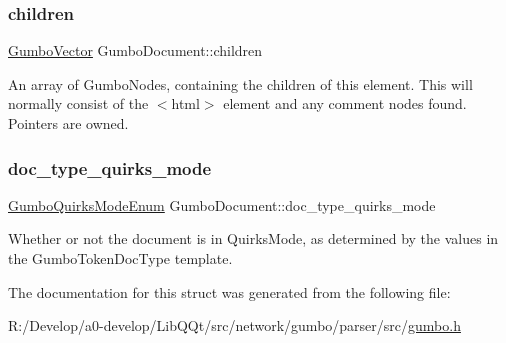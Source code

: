\subsubsection{\texorpdfstring{children}{children}}
{\footnotesize\ttfamily \mbox{\hyperlink{struct_gumbo_vector}{Gumbo\+Vector}} Gumbo\+Document\+::children}

An array of Gumbo\+Nodes, containing the children of this element. This will normally consist of the $<$html$>$ element and any comment nodes found. Pointers are owned. \mbox{\label{struct_gumbo_document_aa8135059f582a2c8309dcdd66eef7772}} 
\subsubsection{\texorpdfstring{doc\+\_\+type\+\_\+quirks\+\_\+mode}{doc\_type\_quirks\_mode}}
{\footnotesize\ttfamily \mbox{\hyperlink{gumbo_8h_aa0cbbfcc7ab2be48ac329ef7e76ff135}{Gumbo\+Quirks\+Mode\+Enum}} Gumbo\+Document\+::doc\+\_\+type\+\_\+quirks\+\_\+mode}

Whether or not the document is in Quirks\+Mode, as determined by the values in the Gumbo\+Token\+Doc\+Type template. 

The documentation for this struct was generated from the following file\+:\begin{DoxyCompactItemize}
\item 
R\+:/\+Develop/a0-\/develop/\+Lib\+Q\+Qt/src/network/gumbo/parser/src/\mbox{\hyperlink{gumbo_8h}{gumbo.\+h}}\end{DoxyCompactItemize}
